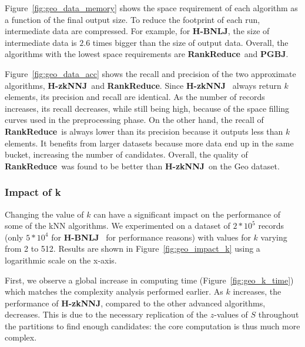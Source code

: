 \documentclass[10pt,journal,compsoc]{IEEEtran}
\newcommand{\Z}{{\bf H-zkNNJ}}
\newcommand{\LSH}{{\bf RankReduce}}
\newcommand{\VO}{{\bf PGBJ}}
\newcommand{\HBNLJ}{{\bf H-BNLJ}}
\begin{document}
Figure~\ref{fig:geo_data_memory} shows the space requirement of each algorithm as a function of the final output size. 
To 
reduce the footprint of each run, intermediate data are compressed. For example, for 
\HBNLJ, the size of intermediate data is $2.6$ times bigger than the size of output data. Overall, the algorithms with 
the
lowest space requirements are \LSH~and \VO.

Figure~\ref{fig:geo_data_acc} shows the recall and precision of the two approximate algorithms, \Z~and \LSH. Since \Z~
always return $k$ elements, its precision and recall are identical. 
As the number of records increases, its recall decreases, while still being high, because of the 
space filling curves used in the preprocessing phase.
On the other hand, the recall of \LSH~is always lower than its precision because it outputs less than $k$ elements. It
benefits from larger datasets because more data end up in the same bucket, increasing the 
number of candidates. Overall, the quality of \LSH~was found to be better than \Z~on the Geo dataset. 

%
\subsubsection{Impact of k}
Changing the value of $k$ can have a significant impact on the performance of some of the kNN 
algorithms. We experimented on a dataset of $2*10^5$ records (only $5*10^4$ for \HBNLJ~ 
for performance reasons) with values for $k$ varying from 2 to 512. Results are shown in 
Figure~\ref{fig:geo_impact_k} using a logarithmic scale on the x-axis.

First, we observe a global increase in computing time (Figure~\ref{fig:geo_k_time}) which matches the complexity 
analysis performed earlier. 
As $k$ increases, the performance of \Z, compared to the other advanced algorithms, decreases. This is due to the 
necessary replication of the $z$-values of $S$ throughout the partitions to find enough candidates: the core 
computation is thus much more complex. 
\end{document}
